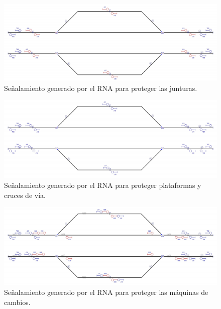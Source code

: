     \begin{figure}[h]
        \centering
        \includegraphics[width=1\textwidth]{resultados-obtenidos/ejemplo5/images/5_step2.png}
        \centering\caption{Señalamiento generado por el RNA para proteger las junturas.}
    \end{figure}

    \begin{figure}[h]
        \centering
        \includegraphics[width=1\textwidth]{resultados-obtenidos/ejemplo5/images/5_step3.png}
        \centering\caption{Señalamiento generado por el RNA para proteger plataformas y cruces de vía.}
    \end{figure}

    \begin{figure}[h]
        \centering
        \includegraphics[width=1\textwidth]{resultados-obtenidos/ejemplo5/images/5_step4.png}
        \centering\caption{Señalamiento generado por el RNA para proteger las máquinas de cambios.}
    \end{figure}

